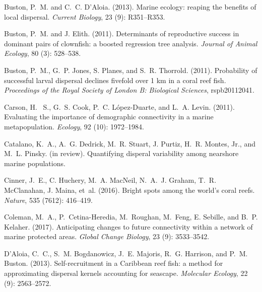 \documentclass[12pt, oneside]{article}   	%
\begin{document}
\begin{thebibliography}{66}
Buston, P.~M. and C.~C. D'Aloia. (2013).
\newblock Marine ecology: reaping the benefits of local dispersal.
\newblock \emph{Current Biology}, 23 (9): R351--R353.

Buston, P.~M. and J. Elith. (2011).
\newblock Determinants of reproductive success in dominant pairs of clownfish:
  a boosted regression tree analysis.
\newblock \emph{Journal of Animal Ecology}, 80 (3): 528--538.

Buston, P.~M., G.~P. Jones, S. Planes, and S.~R. Thorrold. (2011).
\newblock Probability of successful larval dispersal declines fivefold over 1
  km in a coral reef fish.
\newblock \emph{Proceedings of the Royal Society of London B: Biological
  Sciences}, rspb20112041.

Carson, H.~ S., G.~S. Cook, P.~C. L{\'o}pez-Duarte, and L.~A. Levin. (2011).
\newblock Evaluating the importance of demographic connectivity in a marine
  metapopulation.
\newblock \emph{Ecology}, 92 (10): 1972--1984.

Catalano, K.~A., A.~G. Dedrick, M.~R. Stuart, J. Purtiz,
  H.~R. Montes, Jr., and M.~L. Pinsky. (in review).
\newblock Quantifying disperal variability among nearshore marine populations.

Cinner, J.~E., C. Huchery, M.~A. MacNeil, N.~A.~J. Graham, T.~R.
  McClanahan, J. Maina, et~al. (2016).
\newblock Bright spots among the world’s coral reefs.
\newblock \emph{Nature}, 535 (7612): 416--419.

Coleman, M.~A., P.~Cetina-Heredia, M.~Roughan, M.~Feng, E. Sebille, and B.~P. Kelaher. (2017).
\newblock Anticipating changes to future connectivity within a network of
  marine protected areas.
\newblock \emph{Global Change Biology}, 23 (9): 3533--3542.

D'Aloia, C.~C., S.~M. Bogdanowicz, J.~E. Majoris, R.~G. Harrison, and P.~M.
  Buston. (2013).
\newblock Self-recruitment in a Caribbean reef fish: a method for
  approximating dispersal kernels accounting for seascape.
\newblock \emph{Molecular Ecology}, 22 (9): 2563--2572.


\end{thebibliography}
\end{document}
